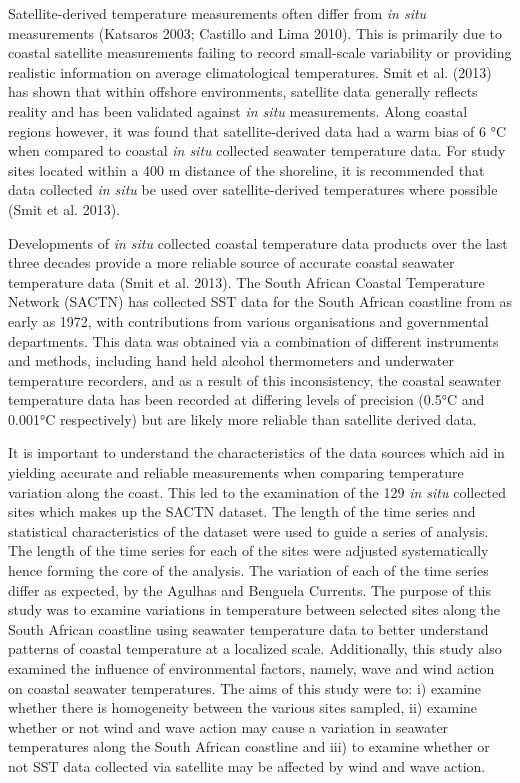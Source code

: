 \documentclass[12pt,]{article}
\begin{document}
Satellite-derived temperature measurements often differ from \emph{in
situ} measurements (Katsaros 2003; Castillo and Lima 2010). This is
primarily due to coastal satellite measurements failing to record
small-scale variability or providing realistic information on average
climatological temperatures. Smit et al. (2013) has shown that within
offshore environments, satellite data generally reflects reality and has
been validated against \emph{in situ} measurements. Along coastal
regions however, it was found that satellite-derived data had a warm
bias of 6 °C when compared to coastal \emph{in situ} collected seawater
temperature data. For study sites located within a 400 m distance of the
shoreline, it is recommended that data collected \emph{in situ} be used
over satellite-derived temperatures where possible (Smit et al. 2013).

Developments of \emph{in situ} collected coastal temperature data
products over the last three decades provide a more reliable source of
accurate coastal seawater temperature data (Smit et al. 2013). The South
African Coastal Temperature Network (SACTN) has collected SST data for
the South African coastline from as early as 1972, with contributions
from various organisations and governmental departments. This data was
obtained via a combination of different instruments and methods,
including hand held alcohol thermometers and underwater temperature
recorders, and as a result of this inconsistency, the coastal seawater
temperature data has been recorded at differing levels of precision
(0.5°C and 0.001°C respectively) but are likely more reliable than
satellite derived data.

It is important to understand the characteristics of the data sources
which aid in yielding accurate and reliable measurements when comparing
temperature variation along the coast. This led to the examination of
the 129 \emph{in situ} collected sites which makes up the SACTN dataset.
The length of the time series and statistical characteristics of the
dataset were used to guide a series of analysis. The length of the time
series for each of the sites were adjusted systematically hence forming
the core of the analysis. The variation of each of the time series
differ as expected, by the Agulhas and Benguela Currents. The purpose of
this study was to examine variations in temperature between selected
sites along the South African coastline using seawater temperature data
to better understand patterns of coastal temperature at a localized
scale. Additionally, this study also examined the influence of
environmental factors, namely, wave and wind action on coastal seawater
temperatures. The aims of this study were to: i) examine whether there
is homogeneity between the various sites sampled, ii) examine whether or
not wind and wave action may cause a variation in seawater temperatures
along the South African coastline and iii) to examine whether or not SST
data collected via satellite may be affected by wind and wave action.
\end{document}
